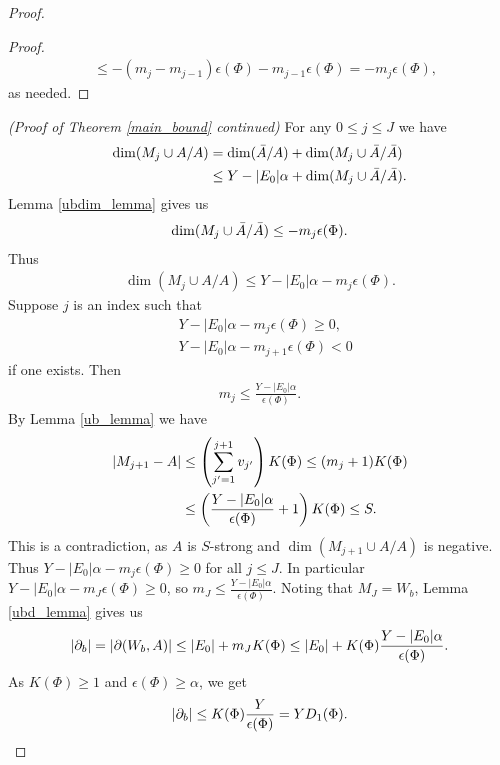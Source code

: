 \begin{proof}
\begin{proof}
\begin{align*}
      &\leq  -(m_j - m_{j-1})\epsilon(\Phi) - m_{j-1}  \epsilon(\Phi) =  - m_j  \epsilon(\Phi),
    \end{align*}
    as needed.
  \end{proof}
  \textit{(Proof of Theorem \ref{main_bound} continued)}
  For any $0 \leq j \leq J$ we have
  \begin{align*}
    \dim(M_j \cup A / A) &= \dim(\bar A / A) + \dim(M_j \cup \bar A / \bar A) \\
    &\leq Y - |E_0|\alpha + \dim(M_j \cup \bar A / \bar A).
  \end{align*}
  Lemma \ref{ubdim_lemma} gives us
  \begin{align*}
    \dim(M_j \cup \bar A / \bar A) \leq -m_j  \epsilon(\Phi).
  \end{align*}
  Thus
  \begin{align*}
    \dim(M_j \cup A / A) \leq Y - |E_0| \alpha - m_j  \epsilon(\Phi).
  \end{align*}
  Suppose $j$ is an index such that
  \begin{align*}
    &Y - |E_0| \alpha - m_j  \epsilon(\Phi) \geq 0, \\
    &Y - |E_0| \alpha - m_{j+1}  \epsilon(\Phi) < 0
  \end{align*}
  if one exists.
  Then 
  \begin{align*}
    m_j \leq \frac{Y - |E_0| \alpha}{\epsilon(\Phi)}.
  \end{align*}
  By Lemma \ref{ub_lemma} we have
  \begin{align*}
    \left|M_{j+1} - A\right| &\leq \left(\sum_{j'=1}^{j+1} v_{j'}\right) K(\Phi) \leq (m_j + 1) K(\Phi) \\
                     &\leq \left(\frac{Y - |E_0| \alpha}{\epsilon(\Phi)} + 1\right) K(\Phi) \leq S.
  \end{align*}
  This is a contradiction, as $A$ is $S$-strong and $\dim(M_{j+1} \cup A / A)$ is negative.
  Thus $Y - |E_0| \alpha - m_j  \epsilon(\Phi) \geq 0$ for all $j \leq J$.
  In particular $Y - |E_0| \alpha - m_J  \epsilon(\Phi) \geq 0$, so $m_J \leq \frac{Y - |E_0| \alpha}{\epsilon(\Phi)}$.
  Noting that $M_J = W_b$, Lemma \ref{ubd_lemma} gives us 
  \begin{align*}
      |\partial_b| = |\partial(W_b, A)| \leq |E_0| + m_J  K(\Phi) \leq |E_0| + K(\Phi) \frac{Y - |E_0| \alpha}{\epsilon(\Phi)}.
  \end{align*}
  As $K(\Phi) \geq 1$ and $\epsilon(\Phi) \geq \alpha$, we get
  \begin{align*}
      |\ppp_b| \leq K(\Phi) \frac{Y}{\epsilon(\Phi)} = Y D_1(\Phi).

\end{align*}
\end{proof}
